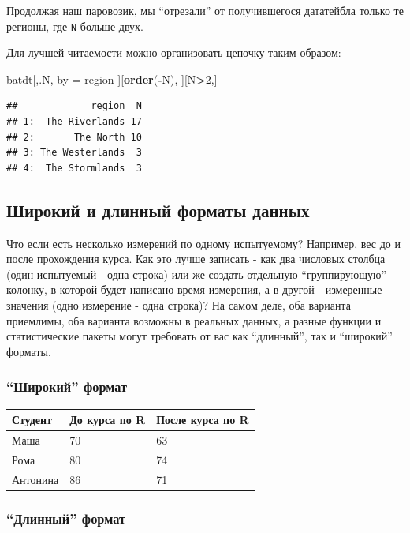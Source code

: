 \documentclass[]{book}
\newenvironment{Shaded}{\begin{snugshade}}{\end{snugshade}}
\newcommand{\KeywordTok}[1]{\textcolor[rgb]{0.13,0.29,0.53}{\textbf{#1}}}
\newcommand{\DecValTok}[1]{\textcolor[rgb]{0.00,0.00,0.81}{#1}}
\newcommand{\StringTok}[1]{\textcolor[rgb]{0.31,0.60,0.02}{#1}}
\newcommand{\OperatorTok}[1]{\textcolor[rgb]{0.81,0.36,0.00}{\textbf{#1}}}
\newcommand{\NormalTok}[1]{#1}
\begin{document}
Продолжая наш паровозик, мы ``отрезали'' от получившегося дататейбла
только те регионы, где \texttt{N} больше двух.

Для лучшей читаемости можно организовать цепочку таким образом:

\begin{Shaded}
\begin{Highlighting}[]
\NormalTok{batdt[,.N, by =}\StringTok{ }\NormalTok{region}
\NormalTok{      ][}\KeywordTok{order}\NormalTok{(}\OperatorTok{-}\NormalTok{N),}
\NormalTok{        ][N}\OperatorTok{>}\DecValTok{2}\NormalTok{,]}
\end{Highlighting}
\end{Shaded}

\begin{verbatim}
##             region  N
## 1:  The Riverlands 17
## 2:       The North 10
## 3: The Westerlands  3
## 4:  The Stormlands  3
\end{verbatim}

\subsection{Широкий и длинный форматы данных}\label{long_wide}

Что если есть несколько измерений по одному испытуемому? Например, вес
до и после прохождения курса. Как это лучше записать - как два числовых
столбца (один испытуемый - одна строка) или же создать отдельную
``группирующую'' колонку, в которой будет написано время измерения, а в
другой - измеренные значения (одно измерение - одна строка)? На самом
деле, оба варианта приемлимы, оба варианта возможны в реальных данных, а
разные функции и статистические пакеты могут требовать от вас как
``длинный'', так и ``широкий'' форматы.

\subsubsection{\texorpdfstring{``Широкий''
формат}{Широкий формат}}\label{wide_f}

\begin{longtable}[]{@{}lll@{}}
\toprule
Студент & До курса по R & После курса по R\tabularnewline
\midrule
\endhead
Маша & 70 & 63\tabularnewline
Рома & 80 & 74\tabularnewline
Антонина & 86 & 71\tabularnewline
\bottomrule
\end{longtable}

\subsubsection{\texorpdfstring{``Длинный''
формат}{Длинный формат}}\label{long_f}
\end{document}
